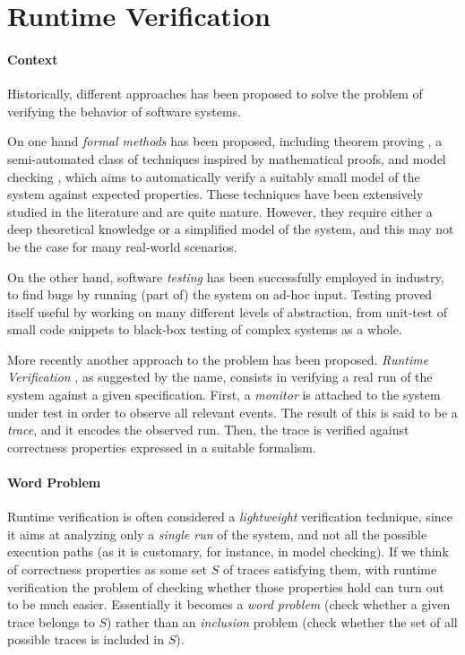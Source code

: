 \section{Runtime Verification}
\label{sec:rv}
\paragraph{Context}
Historically, different approaches has been proposed to solve the problem of verifying the behavior of software systems.

On one hand \emph{formal methods} has been proposed, including theorem proving \cite{itp}, a semi-automated class of techniques inspired by mathematical proofs, and model checking \cite{modelchecking}, which aims to automatically verify a suitably small model of the system against expected properties.
These techniques have been extensively studied in the literature and are quite mature.
However, they require either a deep theoretical knowledge or a simplified model of the system, and this may not be the case for many real-world scenarios.

On the other hand, software \emph{testing} \cite{testing} has been successfully employed in industry, to find bugs by running (part of) the system on ad-hoc input.
Testing proved itself useful by working on many different levels of abstraction, from unit-test of small code snippets to black-box testing of complex systems as a whole.

More recently another approach to the problem has been proposed.
\emph{Runtime Verification} \cite{rv}, as suggested by the name, consists in verifying a real run of the system against a given specification.
First, a \emph{monitor} is attached to the system under test in order to observe all relevant events.
The result of this is said to be a \emph{trace}, and it encodes the observed run.
Then, the trace is verified against correctness properties expressed in a suitable formalism.

\paragraph{Word Problem}
Runtime verification is often considered a \emph{lightweight} verification technique, since it aims at analyzing only a \emph{single run} of the system, and not all the possible execution paths (as it is customary, for instance, in model checking).
If we think of correctness properties as some set \(S\) of traces satisfying them, with runtime verification the problem of checking whether those properties hold can turn out to be much easier.
Essentially it becomes a \emph{word problem} (check whether a given trace belongs to \(S\)) rather than an \emph{inclusion} problem (check whether the set of all possible traces is included in \(S\)).

